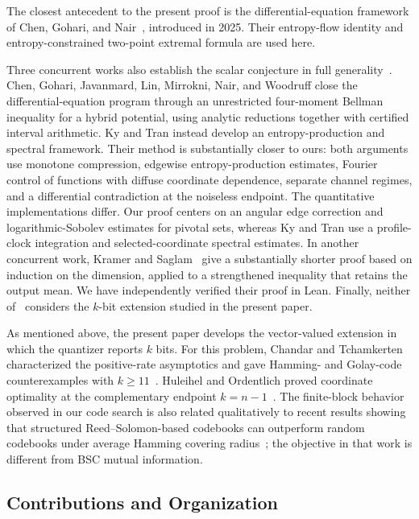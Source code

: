 The closest antecedent to the present proof is the differential-equation
framework of Chen, Gohari, and Nair~\cite{CGN}, introduced in 2025.
Their entropy-flow identity
and entropy-constrained two-point extremal formula are used here. 

Three concurrent works also establish the scalar conjecture in full
generality~\cite{CGJLMNW,KyTran,KramerSaglam}. Chen, Gohari, Javanmard, Lin, Mirrokni,
Nair, and Woodruff close the differential-equation program through an
unrestricted four-moment Bellman inequality for a hybrid potential,
using analytic reductions together with certified interval arithmetic.
Ky and Tran instead develop an entropy-production and spectral framework.
Their method is substantially closer to ours: both arguments use monotone
compression, edgewise entropy-production estimates, Fourier control of
functions with diffuse coordinate dependence, separate channel regimes,
and a differential contradiction at the noiseless endpoint. The
quantitative implementations differ. Our proof centers on an angular
edge correction and logarithmic-Sobolev estimates for pivotal sets,
whereas Ky and Tran use a profile-clock integration and selected-coordinate
spectral estimates. In another concurrent work, Kramer and
Saglam~\cite{KramerSaglam} give a substantially shorter proof based on
induction on the dimension, applied to a strengthened inequality that
retains the output mean. We have independently verified their proof in
Lean. Finally, neither of~\cite{CGJLMNW,KyTran,KramerSaglam} considers the \(k\)-bit extension
studied in the present paper.

As mentioned above, the present paper develops the vector-valued extension in
which the quantizer reports \(k\) bits. For this problem, Chandar and
Tchamkerten characterized the positive-rate asymptotics and
gave Hamming- and Golay-code counterexamples with \(k\geq11\)~\cite{CT}.
Huleihel and Ordentlich proved coordinate optimality at the complementary
endpoint \(k=n-1\)~\cite{HO}. The finite-block behavior observed in our
code search is also related qualitatively to recent results showing that
structured Reed--Solomon-based codebooks can outperform random codebooks
under average Hamming covering radius~\cite{RMcover}; the objective in
that work is different from BSC mutual information.

\subsection{Contributions and Organization}

